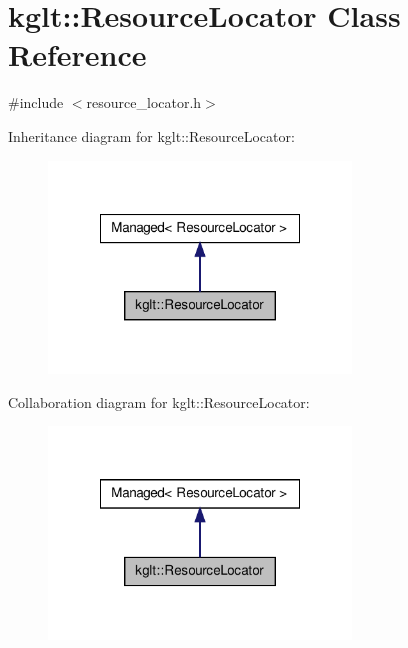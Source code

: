 \hypertarget{classkglt_1_1_resource_locator}{\section{kglt\-:\-:Resource\-Locator Class Reference}
\label{classkglt_1_1_resource_locator}
}


{\ttfamily \#include $<$resource\-\_\-locator.\-h$>$}



Inheritance diagram for kglt\-:\-:Resource\-Locator\-:\nopagebreak
\begin{figure}[H]
\begin{center}
\leavevmode
\includegraphics[width=228pt]{classkglt_1_1_resource_locator__inherit__graph}
\end{center}
\end{figure}


Collaboration diagram for kglt\-:\-:Resource\-Locator\-:\nopagebreak
\begin{figure}[H]
\begin{center}
\leavevmode
\includegraphics[width=228pt]{classkglt_1_1_resource_locator__coll__graph}
\end{center}
\end{figure}
